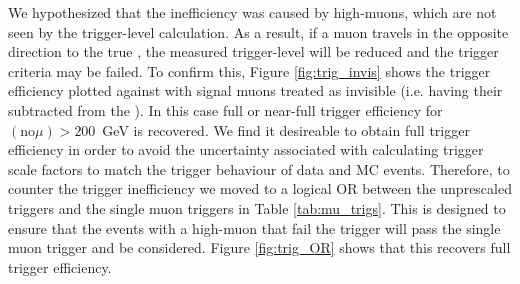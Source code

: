 We hypothesized that the inefficiency was caused by high-\pT muons, which are not seen by the trigger-level \met calculation. As a result, if a muon travels in the opposite direction to the true \met, the measured trigger-level \met will be reduced and the trigger criteria may be failed. To confirm this, Figure \ref{fig:trig_invis} shows the \met trigger efficiency plotted against \met with signal muons treated as invisible (i.e. having their \pT subtracted from the \met).
In this case full or near-full trigger efficiency for \met $(\text{no} \mu) > 200$~GeV is recovered. We find it desireable to obtain full trigger efficiency in order to avoid the uncertainty associated with calculating trigger scale factors to match the trigger behaviour of data and MC events. Therefore, to counter the trigger inefficiency we moved to a logical OR between the unprescaled \met triggers and the single muon triggers in Table \ref{tab:mu_trigs}. This is designed to ensure that the events with a high-\pT muon that fail the \met trigger will pass the single muon trigger and be considered. Figure \ref{fig:trig_OR} shows that this recovers full trigger efficiency.


